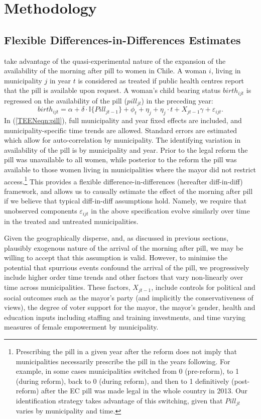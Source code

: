 \section{Methodology}
\label{TEENscn:ID}
\subsection{Flexible Differences-in-Differences Estimates}
\Person take advantage of the quasi-experimental nature of the expansion of the 
availability of the morning after pill to women in Chile.  A woman $i$, living
in municipality $j$ in year $t$ is considered as treated if public health 
centres report that the pill is available upon request.  A woman's child 
bearing status $birth_{ijt}$ is regressed on the availability of the pill 
($pill_{jt}$) in the preceding year:
\begin{equation}
 \label{TEENeqn:pill}
birth_{ijt} = \alpha + \delta\cdot \mathbb{I}\{Pill_{jt-1}\} + \phi_t + \eta_j + 
\eta_j\cdot t + X_{jt-1}\gamma + \varepsilon_{ijt}.
\end{equation}
In (\ref{TEENeqn:pill}), full municipality and year fixed effects are included,
and municipality-specific time trends are allowed.  Standard errors are 
estimated which allow for auto-correlation by municipality.  The identifying 
variation in availability of the pill is by municipality and year.  Prior to 
the legal reform the pill was unavailable to all women, while posterior to the
reform the pill was available to those women living in municipalities where the
mayor did not restrict access.\footnote{Prescribing the pill in a given year
after the reform does not imply that municipalities necessarily prescribe the 
pill in the years following.  For example, in some cases municipalities 
switched from 0 (pre-reform), to 1 (during reform), back to 0 (during reform), 
and then to 1 definitively (post-reform) after the EC pill was made legal in the 
whole country in 2013.
Our identification strategy takes advantage of this switching, given that 
$Pill_{jt}$ varies by municipality and time.}  This provides a flexible 
difference-in-differences (hereafter diff-in-diff) framework, and allows us to 
causally estimate the effect of the morning after pill if we believe that 
typical diff-in-diff assumptions hold.  Namely, we require that unobserved 
components $\varepsilon_{ijt}$ in the above specification evolve similarly over 
time in the treated and untreated municipalities.

Given the geographically disperse, and, as discussed in previous sections,
plausibly exogenous nature of the arrival of the morning after pill, we may be
willing to accept that this assumption is valid.  However, to minimise the 
potential that spurrious events confound the arrival of the pill, we 
progressively include higher order time trends and other factors that vary 
non-linearly over time across municipalities.  These factors, $X_{jt-1}$, 
include controls for political and social outcomes such as the mayor's party
(and implicitly the conservativeness of views), the degree of voter support for
the mayor, the mayor's gender, health and education inputs including staffing
and training investments, and time varying measures of female empowerment by
municipality.

